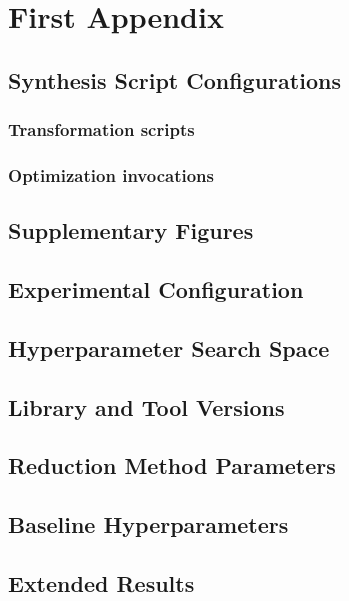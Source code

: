 \chapter{First Appendix}
\label{sec:apx:first_appendix}

\section{Synthesis Script Configurations}
\label{sec:apx:algorithms}

\subsection*{Transformation scripts}

\subsection*{Optimization invocations}

\section{Supplementary Figures}
\label{sec:apx:figures}

\section{Experimental Configuration}
\label{sec:apx:config}

\section{Hyperparameter Search Space}
\label{sec:apx:hpspace}

\section{Library and Tool Versions}
\label{sec:apx:versions}

\section{Reduction Method Parameters}
\label{sec:apx:params}

\section{Baseline Hyperparameters}
\label{sec:apx:baselines}

\section{Extended Results}
\label{sec:apx:results}
